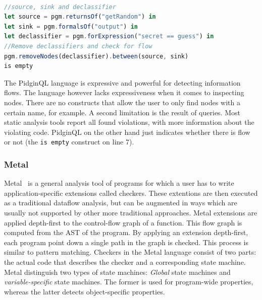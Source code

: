 \begin{lstlisting}[label={lst:PidginExample},language=JavaScript,caption=A typical PidginQL query,mathescape=true]  % float=t?

//source, sink and declassifier
let source = pgm.returnsOf("getRandom") in 			
let sink = pgm.formalsOf("output") in 				
let declassifier = pgm.forExpression("secret == guess") in
//Remove declassifiers and check for flow
pgm.removeNodes(declassifier).between(source, sink)	 		
is empty											
\end{lstlisting}

The PidginQL language is expressive and powerful for detecting information flows. The language however lacks expressiveness when it comes to inspecting nodes. There are no constructs that allow the user to only find nodes with a certain name, for example. A second limitation is the result of queries. Most static analysis tools report all found violations, with more information about the violating code. PidginQL on the other hand just indicates whether there is flow or not (the \texttt{is empty} construct on line 7).

\subsubsection*{Metal}

Metal~\cite{Metal} is a general analysis tool of programs for which a user has to write application-specific extensions called checkers. These extentions are then executed as a traditional dataflow analysis, but can be augmented in ways which are usually not supported by other more traditional approaches. Metal extensions are applied depth-first to the control-flow graph of a function. This flow graph is computed from the AST of the program. By applying an extension depth-first, each program point down a single path in the graph is checked. This process is similar to pattern matching. Checkers in the Metal language consist of two parts: the actual code that describes the checker and a corresponding state machine. Metal distinguish two types of state machines: \textit{Global} state machines and \textit{variable-specific} state machines. The former is used for program-wide properties, whereas the latter detects object-specific properties. 

